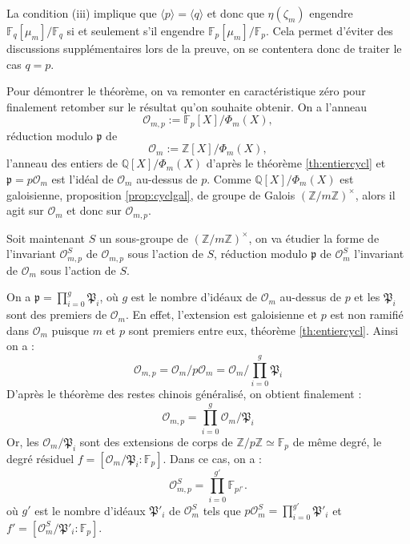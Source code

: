 \documentclass[a4paper]{article} %
\numberwithin{section}{part}
\numberwithin{equation}{section}
\newcommand\zmodninv[1]{(\mathbb{Z}/#1\mathbb{Z})^{\times}}
\newcommand\GF[1]{\mathbb{F}_{#1}}
\newcommand\QQ{\mathbb{Q}}
\newcommand\ZZ{\mathbb{Z}}
\newcommand\EO{\mathcal{O}}
\newcommand\groupgen[1]{\langle{#1}\rangle}
\begin{document}
La condition (iii) implique que $\groupgen{p} = \groupgen{q}$ et donc que
$\eta(\zeta_m)$ engendre $\GF{q}[\mu_m]/\GF{q}$ si et seulement s'il engendre
$\GF{p}[\mu_m]/\GF{p}$. Cela permet d'éviter des discussions supplémentaires 
lors de la preuve, on se contentera donc de traiter le cas $q = p$.\par
Pour démontrer le théorème, on va remonter en caractéristique zéro pour
finalement retomber sur le résultat qu'on souhaite obtenir. On a l'anneau 
\begin{equation}
\EO_{m,p} := \GF{p}[X]/\Phi_m(X),
\end{equation}
réduction modulo $\mathfrak{p}$ de 
\begin{equation}
\EO_m := \ZZ[X]/\Phi_m(X),
\end{equation}
l'anneau des entiers de $\QQ[X]/\Phi_m(X)$ d'après le théorème 
\ref{th:entiercycl} et $\mathfrak{p} = p\EO_m$ est l'idéal de $\EO_m$ au-dessus 
de $p$. Comme $\QQ[X]/\Phi_m(X)$ est galoisienne, proposition 
\ref{prop:cyclgal}, de groupe de Galois $\zmodninv{m}$, alors il agit sur 
$\EO_m$ et donc sur $\EO_{m,p}$.\par
Soit maintenant $S$ un sous-groupe de $\zmodninv{m}$, on va étudier la forme de 
l'invariant $\EO_{m,p}^S$  de $\EO_{m,p}$ sous l'action de $S$, réduction modulo
$\mathfrak{p}$ de $\EO_m^S$ l'invariant de $\EO_m$ sous l'action de $S$.\par
On a $\mathfrak{p} = \prod_{i=0}^g{\mathfrak{P}_i}$, où $g$ est le nombre
d'idéaux de $\EO_m$ au-dessus de $p$ et les $\mathfrak{P}_i$ sont des premiers
de $\EO_m$. En effet, l'extension est galoisienne et $p$ est non ramifié dans 
$\EO_m$ puisque $m$ et $p$ sont premiers entre eux, théorème 
\ref{th:entiercycl}. Ainsi on a :
\begin{equation}
\EO_{m,p} = \EO_m/p\EO_m = \EO_m/\prod_{i=0}^g{\mathfrak{P}_i}
\end{equation}
D'après le théorème des restes chinois généralisé, on obtient finalement :
\begin{equation}
\EO_{m,p} = \prod_{i=0}^g{\EO_m/\mathfrak{P}_i}
\end{equation}
Or, les $\EO_m/\mathfrak{P}_i$ sont des extensions de corps de $\ZZ/p\ZZ\simeq
\GF{p}$ de même degré, le degré résiduel $f = [\EO_m/\mathfrak{P}_i:\GF{p}]$. 
Dans ce cas, on a :
\begin{equation}
\label{eq:structinvSmodp}
\EO_{m,p}^S = \prod_{i=0}^{g'}{\GF{p^{f'}}}.
\end{equation}
où $g'$ est le nombre d'idéaux $\mathfrak{P}'_i$ de $\EO_m^S$ tels que $p\EO_m^S
= \prod_{i = 0}^{g'}{\mathfrak{P}'_i}$ et $f' = 
[\EO_m^S/\mathfrak{P}'_i:\GF{p}]$.
\end{document}
